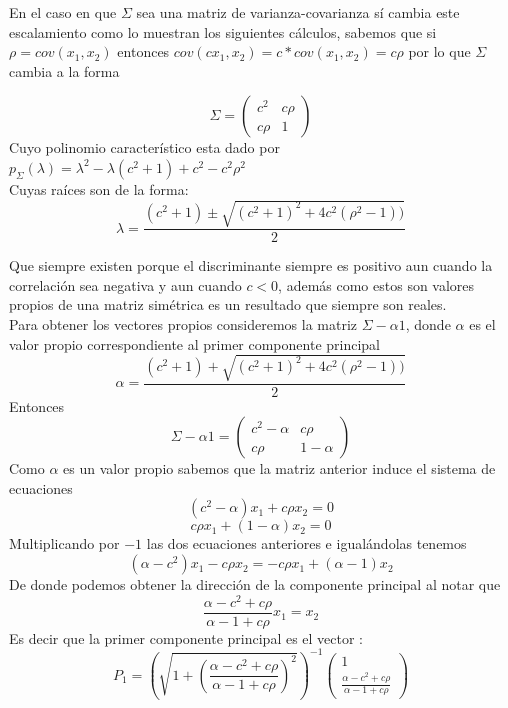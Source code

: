 \documentclass[paper=letter, fontsize=11pt]{scrartcl}
\numberwithin{equation}{section} %
\numberwithin{figure}{section} %
\numberwithin{table}{section} %
\begin{document}
\begin{enumerate}
En el caso en que $\Sigma$ sea una matriz de varianza-covarianza sí cambia este escalamiento como lo muestran los siguientes cálculos, sabemos que si $\rho=cov(x_1,x_2)$ entonces $cov(cx_1,x_2)=c*cov(x_1, x_2)=c\rho$ por lo que $\Sigma$ cambia a la forma 

\[
\Sigma  = \begin{pmatrix}
					c^2  & c\rho \\
                    c\rho & 1
                    \end{pmatrix}
\]
Cuyo polinomio característico esta dado por $p_{\Sigma}(\lambda)=\lambda^2-\lambda(c^2+1) +c^2 -c^2\rho^2$ \\
Cuyas raíces son de la forma:
\[
 \lambda = \frac{(c^2+1) \pm \sqrt{ (c^2 +1)^2+4c^2(\rho^2 -1)) } }{2} 
\]

Que siempre existen porque el discriminante siempre es positivo aun cuando la correlación sea negativa y aun cuando $c<0$, además como estos son valores propios de una matriz simétrica es un resultado que siempre son reales.\\

Para obtener los vectores propios consideremos la matriz $\Sigma -\alpha1$, donde $\alpha$ es el valor propio correspondiente al primer componente principal 
\[
 \alpha = \frac{(c^2+1) + \sqrt{ (c^2 +1)^2+4c^2(\rho^2 -1)) } }{2} 
\]
Entonces 
\[
\Sigma -\alpha1 =\begin{pmatrix}
					c^2 -\alpha & c\rho \\
                    c\rho & 1-\alpha
                    \end{pmatrix}
\]
Como $\alpha$ es un valor propio sabemos que la matriz anterior induce el sistema de ecuaciones 
\begin{equation}
(c^2 -\alpha )x_1 + c\rho x_2 = 0
\end{equation}
\begin{equation}
c\rho x_1 + (1-\alpha)x_2 = 0
\end{equation}
Multiplicando por $-1$ las dos ecuaciones anteriores e igualándolas tenemos 
\begin{equation*}
(\alpha - c^2) x_1 -c\rho x_2 = -c\rho x_1+(\alpha-1)x_2
\end{equation*}
De donde podemos obtener la dirección de la componente principal al notar que 
\[
\frac{\alpha-c^2+c\rho}{\alpha-1+c\rho}x_1 = x_2
\]
Es decir que la primer componente principal es el vector :\\
\[ 
P_1 = 
\left(\sqrt{ 1 + \left(\frac{\alpha-c^2+c\rho}{\alpha-1+c\rho}\right)^2 }\right)^{-1} 
\begin{pmatrix}
1 \\
\frac{\alpha-c^2+c\rho}{\alpha-1+c\rho}
 \end{pmatrix}
\]


\end{enumerate}
\end{document}
